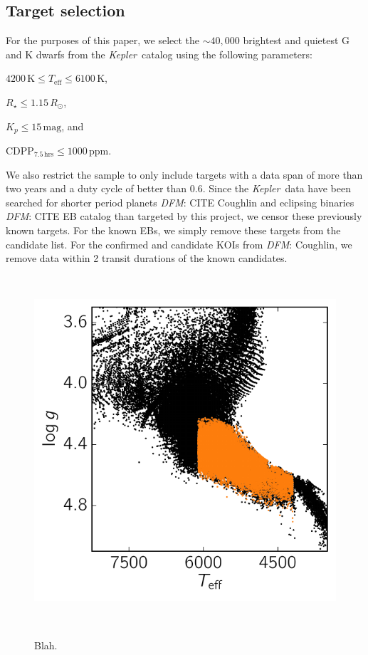\documentclass[manuscript, letterpaper]{aastex6}
\newcommand{\project}[1]{\textsl{#1}}
\newcommand{\kepler}{\project{Kepler}}
\newcommand{\dfmfiglabel}[1]{\label{fig:#1}}
\newcommand{\sectlabel}[1]{\label{sect:#1}}
\newcommand{\unit}[1]{{\ensuremath{\,\mathrm{#1}}}}
\newcommand{\todo}[3]{{\color{#2}\emph{#1}: #3}}
\newcommand{\dfmtodo}[1]{\todo{DFM}{red}{#1}}
\newcommand{\paper}{paper}
\begin{document}
\subsection{Target selection}\sectlabel{data}

For the purposes of this \paper, we select the $\sim40,000$ brightest and
quietest G and K dwarfs from the \kepler\ catalog using the following
parameters:
\begin{itemize}
{\item $4200\unit{K} \le T_\mathrm{eff} \le 6100\unit{K}$,}
{\item $R_\star \le 1.15\,R_\odot$,}
{\item $K_p \le 15\unit{mag}$, and}
{\item $\mathrm{CDPP}_{7.5\unit{hrs}} \le 1000\unit{ppm}$.}
\end{itemize}
We also restrict the sample to only include targets with a data span of more
than two years and a duty cycle of better than $0.6$.
Since the \kepler\ data have been searched for shorter period planets
\dfmtodo{CITE Coughlin} and eclipsing binaries \dfmtodo{CITE EB catalog} than
targeted by this project, we censor these previously known targets.
For the known EBs, we simply remove these targets from the candidate list.
For the confirmed and candidate KOIs from \dfmtodo{Coughlin}, we remove data
within 2 transit durations of the known candidates.

\begin{figure}~\\
\begin{center}
\includegraphics{figures/targets.pdf}
\end{center}
\caption{%
Blah.
\dfmfiglabel{targets}}~\\
\end{figure}
\end{document}
